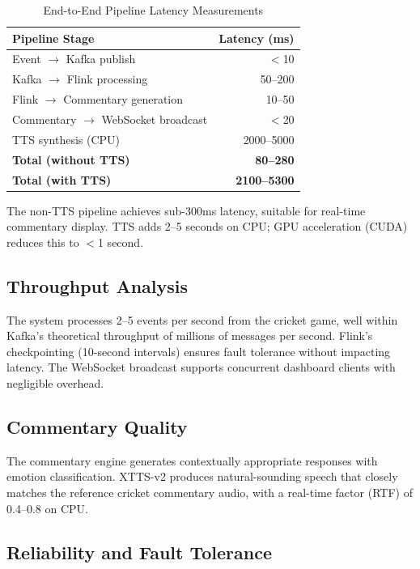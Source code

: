 \documentclass[conference]{IEEEtran}
\begin{document}
\begin{table}[htbp]
\centering
\caption{End-to-End Pipeline Latency Measurements}
\label{tab:performance}
\begin{tabular}{@{}lr@{}}
\toprule
\textbf{Pipeline Stage} & \textbf{Latency (ms)} \\
\midrule
Event $\rightarrow$ Kafka publish & $<$10 \\
Kafka $\rightarrow$ Flink processing & 50--200 \\
Flink $\rightarrow$ Commentary generation & 10--50 \\
Commentary $\rightarrow$ WebSocket broadcast & $<$20 \\
TTS synthesis (CPU) & 2000--5000 \\
\midrule
\textbf{Total (without TTS)} & \textbf{80--280} \\
\textbf{Total (with TTS)} & \textbf{2100--5300} \\
\bottomrule
\end{tabular}
\end{table}

The non-TTS pipeline achieves sub-300ms latency, suitable for real-time commentary display. TTS adds 2--5 seconds on CPU; GPU acceleration (CUDA) reduces this to $<$1 second.

\subsection{Throughput Analysis}

The system processes 2--5 events per second from the cricket game, well within Kafka's theoretical throughput of millions of messages per second. Flink's checkpointing (10-second intervals) ensures fault tolerance without impacting latency. The WebSocket broadcast supports concurrent dashboard clients with negligible overhead.

\subsection{Commentary Quality}

The commentary engine generates contextually appropriate responses with emotion classification. XTTS-v2 produces natural-sounding speech that closely matches the reference cricket commentary audio, with a real-time factor (RTF) of 0.4--0.8 on CPU.

\subsection{Reliability and Fault Tolerance}
\end{document}
